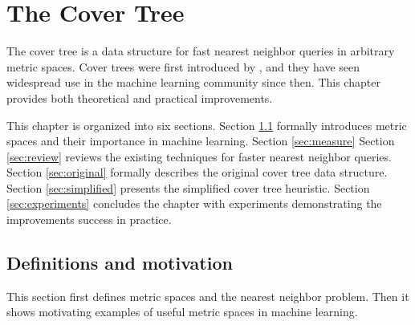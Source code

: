 \documentclass[thesis.tex]{subfiles}
\begin{document}
\chapter{The Cover Tree}

The cover tree is a data structure for fast nearest neighbor queries in arbitrary metric spaces.
Cover trees were first introduced by \cite{beygelzimer2006cover},
and they have seen widespread use in the machine learning community since then.
This chapter provides both theoretical and practical improvements.

This chapter is organized into six sections.
Section \ref{sec:metric} formally introduces metric spaces and their importance in machine learning.
Section \ref{sec:measure} 
Section \ref{sec:review} reviews the existing techniques for faster nearest neighbor queries.
Section \ref{sec:original} formally describes the original cover tree data structure.
Section \ref{sec:simplified} presents the simplified cover tree heuristic.
Section \ref{sec:experiments} concludes the chapter with experiments demonstrating the improvements success in practice.


\section{Definitions and motivation}
\label{sec:metric}

This section first defines metric spaces and the nearest neighbor problem.
Then it shows motivating examples of useful metric spaces in machine learning.
\end{document}
